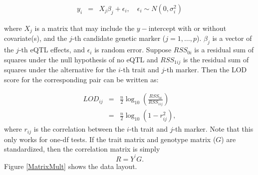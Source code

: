 \documentclass[9pt,twocolumn,twoside,lineno]{gsag3jnl}
\begin{document}
\begin{eqnarray*}
	y_i &=& X_j \beta_j+ \epsilon_i,
	\quad \epsilon_i \sim N(0,\sigma_i^2)
\end{eqnarray*}

where ${X}_j$ is a matrix that may include the $y-$intercept with
or without covariate(s), and the $j$-th candidate genetic marker
($j=1,\ldots,p$).  ${\beta}_j$ is a vector of the $j$-th eQTL
effects, and ${\epsilon}_i$ is random error.  Suppose $RSS_{0i}$
is a residual sum of squares under the null hypothesis of no eQTL
and $RSS_{1ij}$ is the residual sum of squares under the
alternative for the $i$-th trait and $j$-th marker.  Then the LOD
score for the corresponding pair can be written as:

\begin{eqnarray*}
	LOD_{ij} &=& \frac{n}{2} \log_{10} \left( \frac{RSS_{0i}}{RSS_{1ij}} \right)\\
	&=& \frac{n}{2} \log_{10} \left( 1{-}r_{ij}^2 \right),
\end{eqnarray*}
where $r_{ij}$ is the correlation between the $i$-th trait and
$j$-th marker. Note that this only works for one-df tests.  If the
trait matrix and genotype matrix ($G$) are standardized, then the
correlation matrix is simply $$R=Y^{'}G.$$
Figure \ref{MatrixMult} shows the data layout.
\end{document}
